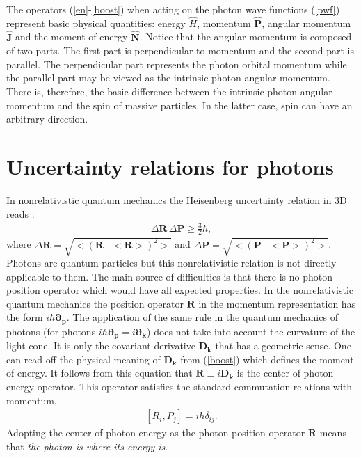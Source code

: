 \documentclass[twocolumn,aps,pra,10pt]{revtex4-1}
\begin{document}
The operators (\ref{en}-\ref{boost}) when acting on the photon wave functions (\ref{pwf}) represent basic physical quantities: energy ${\hat H}$, momentum ${\hat{\bm P}}$, angular momentum ${\hat{\bm J}}$ and the moment of energy ${\hat{\bm N}}$. Notice that the angular momentum is composed of two parts. The first part is perpendicular to momentum and the second part is parallel. The perpendicular part represents the photon orbital momentum while the parallel part may be viewed as the intrinsic photon angular momentum. There is, therefore, the basic difference between the intrinsic photon angular momentum and the spin of massive particles. In the latter case, spin can have an arbitrary direction.

\section{Uncertainty relations for photons}

In nonrelativistic quantum mechanics the Heisenberg uncertainty relation in 3D reads :
\begin{align}\label{hur}
\Delta{\bm R}\,\Delta{\bm P}\ge\frac{3}{2}\hbar,
\end{align}
where $\Delta{\bm R}=\sqrt{<({\bm R}-<{\bm R}>)^2>}$ and $\Delta{\bm P}=\sqrt{<({\bm P}-<{\bm P}>)^2>}$.
Photons are quantum particles but this nonrelativistic relation is not directly applicable to them. The main source of difficulties is that there is no photon position operator which would have all expected properties. In the nonrelativistic quantum mechanics the position operator ${\bm R}$ in the momentum representation has the form $i\hbar{\bm{\partial}_{\bm p}}$. The application of the same rule in the quantum mechanics of photons (for photons $i\hbar{\bm{\partial}}_{\bm p}=i{\bm{\partial}}_{\bm k}$) does not take into account the curvature of the light cone. It is only the covariant derivative ${\bm D}_{\bm k}$ that has a geometric sense. One can read off the physical meaning of ${\bm D}_{\bm k}$ from (\ref{boost}) which defines the moment of energy. It follows from this equation that ${\bm R}\equiv i{\bm D}_{\bm k}$ is the center of photon energy operator. This operator satisfies the standard commutation relations with momentum,
\begin{align}\label{crel}
[R_i,P_j]=i\hbar\delta_{ij}.
\end{align}
Adopting the center of photon energy as the photon position operator ${\bm R}$ means that {\em the photon is where its energy is}.
\end{document}
